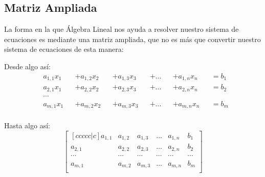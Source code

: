 \documentclass[12pt, fleqn]{report}                             %
\begin{document}
            \clearpage
            \subsection{Matriz Ampliada}
                La forma en la que Álgebra Lineal nos ayuda a resolver nuestro sistema de ecuaciones
                es mediante una matriz ampliada, que no es más que convertir nuestro sistema
                de ecuaciones de esta manera:

                Desde algo así:
                \begin{equation}
                    \begin{split}
                        & a_{1,1}x_1 &&+ a_{1,2}x_2 &&+ a_{1,3}x_3 &&+ \dots &&+ a_{1,n}x_n &&= b_1 \\
                        & a_{2,1}x_1 &&+ a_{2,2}x_2 &&+ a_{2,3}x_3 &&+ \dots &&+ a_{2,n}x_n &&= b_2 \\
                        & \cdots                                                                    \\
                        & a_{m,1}x_1 &&+ a_{m,2}x_2 &&+ a_{m,3}x_3 &&+ \dots &&+ a_{m,n}x_n &&= b_m \\
                    \end{split}
                \end{equation}

                Hasta algo así:
                \begin{equation}
                    \begin{bmatrix}[ccccc|c]
                        a_{1,1} & a_{1,2} & a_{1,3} & \dots  & a_{1,n} & b_1     \\
                        a_{2,1} & a_{2,2} & a_{2,3} & \dots  & a_{2,n} & b_2     \\
                        \cdots  & \cdots  & \cdots  & \cdots & \cdots  & \cdots  \\
                        a_{m,1} & a_{m,2} & a_{m,3} & \dots  & a_{m,n} & b_m     \\
                    \end{bmatrix}
                \end{equation}


\end{document}
